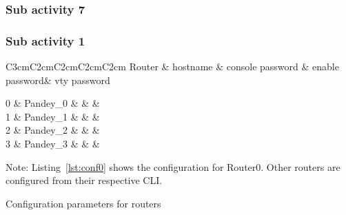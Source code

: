 \documentclass{lab_sheet}
\newcommand{\parameter}[1]{
    \begin{tabular}{C{3cm}C{2cm}C{2cm}C{2cm}C{2cm}}
        \toprule
        Router & hostname & console password & enable password& vty password\\
        \midrule
          #1 
          \bottomrule
       \end{tabular}
}
\newcommand{\customcaption}[2]{
    \begin{mdframed}[backgroundcolor=bg,innerbottommargin=-2.5em]
        
          \end{mdframed}
}
\begin{document}
    \subsubsection*{Sub activity 7}
    \customcaption{hname0}{Syntax for configuring hostname on Router 0}
    \customcaption{hname1}{Syntax for configuring hostname on Router 1} 
    \subsubsection*{Sub activity 1}

    \begin{table}[H]
        \centering
        \begin{threeparttable}
        \parameter{
        0 & Pandey\_0 &  & \multirow{4}{*}{407} & \multirow{4}{*}{pandey}\\
        1 & Pandey\_1 & & & \\
        2 & Pandey\_2 & & & \\
        3 & Pandey\_3 & & & \\
       }
  \begin{tablenotes}
    \small
    \item Note: Listing~\ref{lst:conf0} shows the configuration for Router0. Other routers are configured from their respective CLI.
  \end{tablenotes}
  \caption{Configuration parameters for routers}
  \label{tbl:parameter}
        \end{threeparttable}
    \end{table}
    \customcaption{conf0}{Syntax for configuring mentioned parameters on Router 0}
\end{document}
